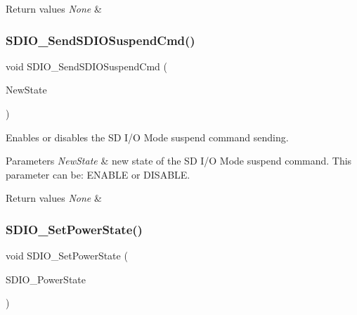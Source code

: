 \begin{DoxyRetVals}{Return values}
{\em None} & \\
\hline
\end{DoxyRetVals}
\mbox{\label{group___s_d_i_o___private___functions_ga9264137a01a1ab81d03bc80a3b3120fc}} 
\subsubsection{\texorpdfstring{SDIO\_SendSDIOSuspendCmd()}{SDIO\_SendSDIOSuspendCmd()}}
{\footnotesize\ttfamily void S\+D\+I\+O\+\_\+\+Send\+S\+D\+I\+O\+Suspend\+Cmd (\begin{DoxyParamCaption}\item[{\mbox{\hyperlink{group___exported__types_gac9a7e9a35d2513ec15c3b537aaa4fba1}{Functional\+State}}}]{New\+State }\end{DoxyParamCaption})}



Enables or disables the SD I/O Mode suspend command sending. 


\begin{DoxyParams}{Parameters}
{\em New\+State} & new state of the SD I/O Mode suspend command. This parameter can be\+: E\+N\+A\+B\+LE or D\+I\+S\+A\+B\+LE. \\
\hline
\end{DoxyParams}

\begin{DoxyRetVals}{Return values}
{\em None} & \\
\hline
\end{DoxyRetVals}
\mbox{\label{group___s_d_i_o___private___functions_ga36ecca32b904de74218fbe65cd5f5270}} 
\subsubsection{\texorpdfstring{SDIO\_SetPowerState()}{SDIO\_SetPowerState()}}
{\footnotesize\ttfamily void S\+D\+I\+O\+\_\+\+Set\+Power\+State (\begin{DoxyParamCaption}\item[{uint32\+\_\+t}]{S\+D\+I\+O\+\_\+\+Power\+State }\end{DoxyParamCaption})}



